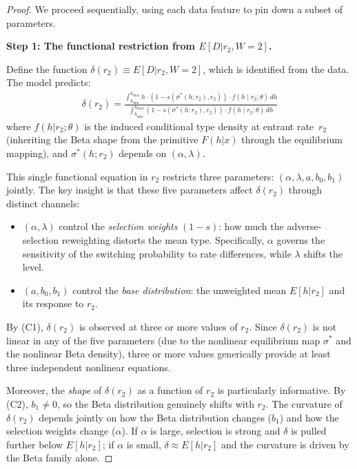 \documentclass[12pt]{article}
\theoremstyle{plain}
\theoremstyle{plain}
\theoremstyle{definition}  %
\theoremstyle{remark}  %
\begin{document}
\begin{proof}
We proceed sequentially, using each data feature to pin down a subset of parameters.

\medskip\noindent
\textbf{Step 1: The functional restriction from $E[D|r_2, W\!=\!2]$.}

Define the function $\delta(r_2) \equiv E[D|r_2, W\!=\!2]$, which is identified from the data.  The model predicts:
\begin{align}\label{eq:delta}
    \delta(r_2) = \frac{\int_{h_{\min}}^{h_{\max}} h \cdot (1-s(\sigma^*(h;r_2),r_2)) \cdot f(h \mid r_2; \theta)\, dh}{\int_{h_{\min}}^{h_{\max}} (1-s(\sigma^*(h;r_2),r_2)) \cdot f(h \mid r_2; \theta)\, dh}
\end{align}
where $f(h|r_2;\theta)$ is the induced conditional type density at entrant rate~$r_2$ (inheriting the Beta shape from the primitive $F(h|x)$ through the equilibrium mapping), and $\sigma^*(h;r_2)$ depends on $(\alpha, \lambda)$.

This single functional equation in $r_2$ restricts three parameters: $(\alpha, \lambda, a, b_0, b_1)$ jointly.  The key insight is that these five parameters affect $\delta(r_2)$ through distinct channels:
\begin{itemize}
    \item $(\alpha, \lambda)$ control the \emph{selection weights} $(1-s)$: how much the adverse-selection reweighting distorts the mean type.  Specifically, $\alpha$ governs the sensitivity of the switching probability to rate differences, while $\lambda$ shifts the level.
    \item $(a, b_0, b_1)$ control the \emph{base distribution}: the unweighted mean $E[h|r_2]$ and its response to $r_2$.
\end{itemize}

By (C1), $\delta(r_2)$ is observed at three or more values of $r_2$.  Since $\delta(r_2)$ is not linear in any of the five parameters (due to the nonlinear equilibrium map $\sigma^*$ and the nonlinear Beta density), three or more values generically provide at least three independent nonlinear equations.  

Moreover, the \emph{shape} of $\delta(r_2)$ as a function of $r_2$ is particularly informative.  By (C2), $b_1 \neq 0$, so the Beta distribution genuinely shifts with $r_2$.  The curvature of $\delta(r_2)$ depends jointly on how the Beta distribution changes ($b_1$) and how the selection weights change ($\alpha$).  If $\alpha$ is large, selection is strong and $\delta$ is pulled further below $E[h|r_2]$; if $\alpha$ is small, $\delta \approx E[h|r_2]$ and the curvature is driven by the Beta family alone.


\end{proof}
\end{document}
